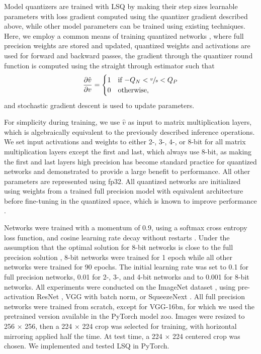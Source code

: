 \documentclass{article}
\begin{document}
Model quantizers are trained with LSQ by making their step sizes learnable parameters with loss gradient computed using the quantizer gradient described above, while other model parameters can be trained using existing techniques.
%
Here, we employ a common means of training quantized networks \citep{courbariaux2015binaryconnect},
%
where full precision weights are stored and updated, quantized weights and activations are used for forward and backward passes, the gradient through the quantizer round function is computed using the straight through estimator \citep{bengio2013estimating} such that
%
\begin{equation}\label{eq:xgrad}
	\frac{\partial \hat{v}}{\partial v} = 
	\begin{cases}
		1 & \text{if $-Q_N < \sfrac{v}{s} < Q_P$} \\
		0 & \text{otherwise},
	\end{cases}
\end{equation}
and stochastic gradient descent is used to update parameters.


For simplicity during training, we use $\hat{v}$ as input to matrix multiplication layers, which is algebraically equivalent to the previously described inference operations.
%
We set input activations and weights to either 2-, 3-, 4-, or 8-bit for all matrix multiplication layers except the first and last, which always use 8-bit, as making the first and last layers high precision has become standard practice for quantized networks and demonstrated to provide a large benefit to performance.  All other parameters are represented using fp32.
%
All quantized networks are initialized using weights from a trained full precision model with equivalent architecture before fine-tuning in the quantized space, which is known to improve performance \citep{sung2015resiliency,zhou2016dorefa,mishra2017apprentice,mckinstry2018discovering}.



Networks were trained with a momentum of 0.9, using a softmax cross entropy loss function, and cosine learning rate decay without restarts \citep{DBLP:journals/corr/LoshchilovH16a}.
%
Under the assumption that the optimal solution for 8-bit networks is close to the full precision solution \citep{mckinstry2018discovering}, 8-bit networks were trained for 1 epoch while all other networks were trained for 90 epochs.
%
The initial learning rate was set to 0.1 for full precision networks, 0.01 for 2-, 3-, and 4-bit networks and to 0.001 for 8-bit networks.
%
All experiments were conducted on the ImageNet dataset \citep{russakovsky2015imagenet}, using pre-activation ResNet \citep{he2016deep}, VGG \citep{simonyan2014very} with batch norm, or SqueezeNext \citep{gholami2018squeezenext}.
%
All full precision networks were trained from scratch, except for VGG-16bn, for which we used the pretrained version available in the PyTorch model zoo.
%
Images were resized to 256 $\times$ 256, then a 224 $\times$ 224 crop was selected for training, with horizontal mirroring applied half the time.  At test time, a 224 $\times$ 224 centered crop was chosen.
%
We implemented and tested LSQ in PyTorch.
\end{document}
